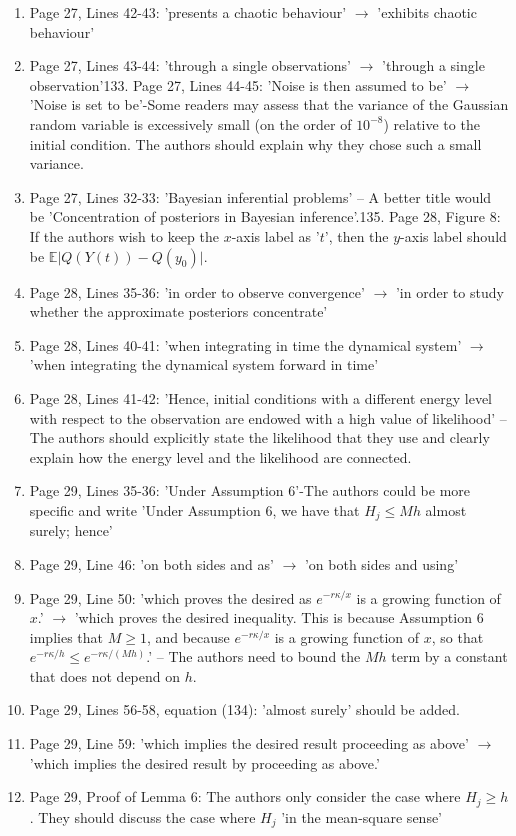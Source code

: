 \documentclass{article}
\begin{document}
\begin{enumerate}[label=(\arabic*)]
		\item Page 27, Lines 42-43: 'presents a chaotic behaviour' $\to$ 'exhibits chaotic behaviour'
		\item Page 27, Lines 43-44: 'through a single observations' $\to$ 'through a single observation'133. Page 27, Lines 44-45: 'Noise is then assumed to be' $\to$ 'Noise is set to be'-Some readers may assess that the variance of the Gaussian random variable is excessively small (on the order of $10^{-8}$) relative to the initial condition. The authors should explain why they chose such a small variance.
		\item Page 27, Lines 32-33: 'Bayesian inferential problems' -- A better title would be 'Concentration of posteriors in Bayesian inference'.135. Page 28, Figure 8: If the authors wish to keep the $x$-axis label as '$t$', then the $y$-axis label should be $\mathbb{E}\vert Q(Y(t))-Q(y_0)\vert$.
		\item Page 28, Lines 35-36: 'in order to observe convergence' $\to$ 'in order to study whether the approximate posteriors concentrate'
		\item Page 28, Lines 40-41: 'when integrating in time the dynamical system' $\to$ 'when integrating the dynamical system forward in time'
		\item Page 28, Lines 41-42: 'Hence, initial conditions with a different energy level with respect to the observation are endowed with a high value of likelihood' -- The authors should explicitly state the likelihood that they use and clearly explain how the energy level and the likelihood are connected.
		\item Page 29, Lines 35-36: 'Under Assumption 6'-The authors could be more specific and write 'Under Assumption 6, we have that $H_j\leq Mh$ almost surely; hence'
		\item Page 29, Line 46: 'on both sides and as' $\to$ 'on both sides and using'
		\item Page 29, Line 50: 'which proves the desired as $e^{-r\kappa/x}$ is a growing function of $x$.' $\to$ 'which proves the desired inequality. This is because Assumption 6 implies that $M\geq 1$, and because $e^{-r\kappa/x}$ is a growing function of $x$, so that $e^{-r\kappa/ h} \leq e^{-r\kappa /(Mh)}$.' -- The authors need to bound the $Mh$ term by a constant that does not depend on $h$.
		\item Page 29, Lines 56-58, equation (134): 'almost surely' should be added.
		\item Page 29, Line 59: 'which implies the desired result proceeding as above' $\to$ 'which implies the desired result by proceeding as above.'
		\item Page 29, Proof of Lemma 6: The authors only consider the case where $H_j\geq h$. They should discuss the case where $H_j$ 'in the mean-square sense'
\end{enumerate}
			
\end{document}
